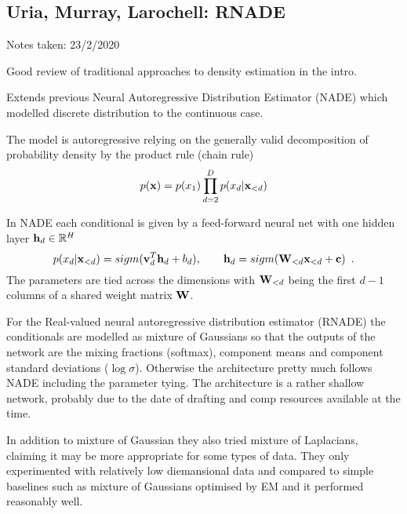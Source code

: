 \subsection{Uria, Murray, Larochell: RNADE}

\begin{notebox}

\hfill Notes taken: 23/2/2020 
\end{notebox}

Good review of traditional approaches to density estimation in the intro.

Extends previous Neural Autoregressive Distribution Estimator (NADE) which modelled discrete distribution to the continuous case.

The model is autoregressive relying on the generally valid decomposition of probability density by the product rule (chain rule)
\begin{equation}
p(\mathbf{x}) = p(x_1) \prod_{d=2}^D p(x_d \vert \mathbf{x}_{<d})
\end{equation}

In NADE each conditional is given by a feed-forward neural net with one hidden layer $\mathbf{h}_d \in \mathbb{R}^H$
\begin{equation}
p(x_d \vert \mathbf{x}_{<d}) = sigm(\mathbf{v}_d^T \mathbf{h}_d + b_d), \qquad \mathbf{h}_d = sigm(\mathbf{W}_{<d} \mathbf{x}_{<d} + \mathbf{c}) \enspace .
\end{equation}
The parameters are tied across the dimensions with $\mathbf{W}_{<d}$ being the first $d-1$ columns of a shared weight matrix $\mathbf{W}$.

For the Real-valued neural autoregressive distribution estimator (RNADE) the conditionals are modelled as mixture of Gaussians  so that the outputs of the network are the mixing fractions (softmax), component means and component standard deviations ($\log \sigma$).
Otherwise the architecture pretty much follows NADE including the parameter tying.
The architecture is a rather shallow network, probably due to the date of drafting and comp resources available at the time.

In addition to mixture of Gaussian they also tried mixture of Laplacians, claiming it may be more appropriate for some types of data.
They only experimented with relatively low diemansional data and compared to simple baselines such as mixture of Gaussians optimised by EM and it performed reasonably well.

